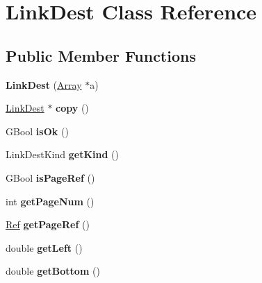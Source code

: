 \hypertarget{class_link_dest}{}\section{Link\+Dest Class Reference}
\label{class_link_dest}
\subsection*{Public Member Functions}
\begin{DoxyCompactItemize}
\item 
\mbox{\label{class_link_dest_a2bdc1788b49404e79f5f5edd3877aabf}} 
{\bfseries Link\+Dest} (\hyperlink{class_array}{Array} $\ast$a)
\item 
\mbox{\label{class_link_dest_adac635cc1ec827a9452a03d1b6e6412c}} 
\hyperlink{class_link_dest}{Link\+Dest} $\ast$ {\bfseries copy} ()
\item 
\mbox{\label{class_link_dest_a81ade5e0c41d1af4ea6bd02b696db96c}} 
G\+Bool {\bfseries is\+Ok} ()
\item 
\mbox{\label{class_link_dest_aeb6e4f9ec672abfd940bcac6cab5bdce}} 
Link\+Dest\+Kind {\bfseries get\+Kind} ()
\item 
\mbox{\label{class_link_dest_ae71c931419b2d94f5edf9cc179e66a22}} 
G\+Bool {\bfseries is\+Page\+Ref} ()
\item 
\mbox{\label{class_link_dest_a1b1e654ca2f72ca4c11eb83f3aa5520a}} 
int {\bfseries get\+Page\+Num} ()
\item 
\mbox{\label{class_link_dest_ad1eded2257e1fc302863b1af071c464f}} 
\hyperlink{struct_ref}{Ref} {\bfseries get\+Page\+Ref} ()
\item 
\mbox{\label{class_link_dest_a90caf84ec76c4124519bb063ec2415d8}} 
double {\bfseries get\+Left} ()
\item 
\mbox{\label{class_link_dest_a4ae7d5cd269b1e36ea7fd64613480ff7}} 
double {\bfseries get\+Bottom} ()
\item 
\mbox{\label{class_link_dest_a8ffb493a567566ffd97e40a57a8a7184}} 

\end{DoxyCompactItemize}
